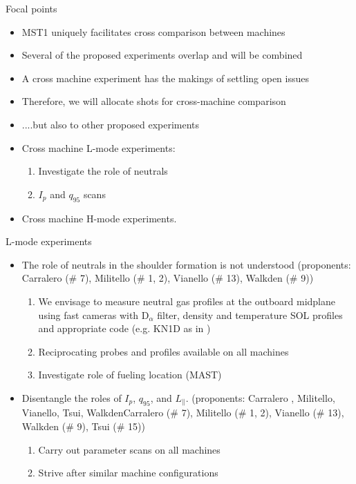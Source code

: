 \documentclass[10pt, compress]{beamer}
\begin{document}
\begin{frame}{Focal points}
\begin{itemize}
	\item MST1 uniquely facilitates cross comparison between machines
	\item Several of the proposed experiments overlap and will be combined
	\item A cross machine experiment has the makings of settling open issues
	\item Therefore, we will allocate shots for cross-machine comparison
	\item ....but also to other proposed experiments
	\item Cross machine L-mode experiments: 
	\begin{enumerate}
		\item Investigate the role of neutrals 
		\item $I_p$ and $q_{95}$ scans
	\end{enumerate}
	\item Cross machine H-mode experiments. 
\end{itemize}	
\end{frame}

\begin{frame}{L-mode experiments}
	\begin{itemize}
		\item The role of neutrals in the shoulder formation is not understood
                  {\scriptsize(proponents: Carralero (\# 7), Militello
                    (\# 1, 2), Vianello (\# 13), Walkden (\# 9))}
		\begin{enumerate}
		\item We envisage to measure neutral gas profiles at the outboard midplane
                  using fast cameras with D$_{\alpha}$ filter, density
                  and temperature SOL profiles and appropriate code
                  (e.g. KN1D as in \parencite{Lipschultz:2005gg,Lipschultz:2016vk})
		\item Reciprocating probes and profiles available on
                  all machines
                \item Investigate role of fueling location (MAST)
		\end{enumerate}
		\item Disentangle the roles of $I_p$, $q_{95}$, and $L_{\|}$.
                  {\scriptsize(proponents: Carralero , Militello, Vianello, Tsui, WalkdenCarralero (\# 7), Militello
                    (\# 1, 2), Vianello (\# 13), Walkden (\# 9), Tsui
                    (\# 15))}
		\begin{enumerate}
			\item Carry out parameter scans on all machines
			\item Strive after similar machine configurations
		\end{enumerate}
	\end{itemize}
\end{frame}
\end{document}

